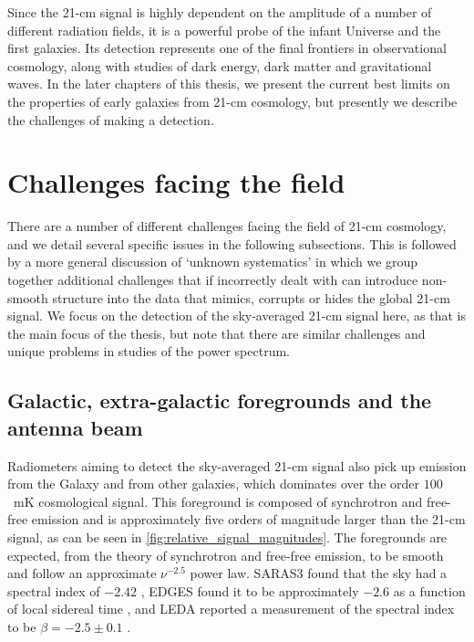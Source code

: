 Since the 21-cm signal is highly dependent on the amplitude of a number of different radiation fields, it is a powerful probe of the infant Universe and the first galaxies. Its detection represents one of the final frontiers in observational cosmology, along with studies of dark energy, dark matter and gravitational waves. In the later chapters of this thesis, we present the current best limits on the properties of early galaxies from 21-cm cosmology, but presently we describe the challenges of making a detection.

\section{Challenges facing the field}

There are a number of different challenges facing the field of 21-cm cosmology, and we detail several specific issues in the following subsections. This is followed by a more general discussion of `unknown systematics' in which we group together additional challenges that if incorrectly dealt with can introduce non-smooth structure into the data that mimics, corrupts or hides the global 21-cm signal. We focus on the detection of the sky-averaged 21-cm signal here, as that is the main focus of the thesis, but note that there are similar challenges and unique problems in studies of the power spectrum.

\subsection{Galactic, extra-galactic foregrounds and the antenna beam}
\label{sec:foregrounds}

Radiometers aiming to detect the sky-averaged 21-cm signal also pick up emission from the Galaxy and from other galaxies, which dominates over the order $100$~mK cosmological signal. This foreground is composed of synchrotron and free-free emission and is approximately five orders of magnitude larger than the 21-cm signal, as can be seen in \cref{fig:relative_signal_magnitudes}. The foregrounds are expected, from the theory of synchrotron and free-free emission, to be smooth and follow an approximate $\nu^{-2.5}$ power law. SARAS3 found that the sky had a spectral index of $-2.42$ \cite{SARAS3}, EDGES found it to be approximately $-2.6$ as a function of local sidereal time \cite{Mozdzen_EDGES_spectral_index_2017}, and LEDA reported a measurement of the spectral index to be $\beta = -2.5 \pm 0.1$ \cite{LEDA_spectral_Index_2021}.

